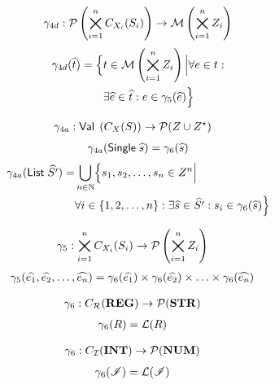 \begin{align}
    \gamma_{4d} : \mathcal{P}\left(\bigtimes_{i = 1}^{n}C_{X_i}(S_i)\right) \rightarrow \mathcal{M}\left(\bigtimes_{i = 1}^n Z_i\right)
\end{align}
\begin{align}
    \begin{split}
        \gamma_{4d}(\widehat{t}) = \Bigl\{ &t \in \mathcal{M}\left(\bigtimes_{i = 1}^n Z_i\right) \Big|\forall e \in t : \\
        &\exists \widehat{e} \in \widehat{t} :e \in \gamma_5(\widehat{e}) \Bigr\}
    \end{split}
\end{align}

\begin{align}
    \gamma_{4a} &: \mathsf{Val} \; \left(C_{X}(S)\right) \rightarrow \mathcal{P}(Z \cup Z^\star)
\end{align}
\begin{align}
    \gamma_{4a}(\mathsf{Single} \; \widehat{s}) = \gamma_6(\widehat{s})
\end{align}
\begin{align}
    \begin{split}
        \gamma_{4a}(\mathsf{List} \; \widehat{S'}) = &\bigcup_{n \in \mathbb{N}}\Bigl\{s_1, s_2, \dots, s_n \in Z^n \Big| \\
        &\forall i \in \{1, 2, \dots, n\} : \exists \widehat{s} \in \widehat{S'} : s_i \in \gamma_6(\widehat{s}) \Bigr\}
    \end{split}
\end{align}

\begin{align}
    \gamma_5 &: \bigtimes_{i = 1}^{n}C_{X_i}(S_i) \rightarrow \mathcal{P}\left(\bigtimes_{i = 1}^n Z_i \right)
\end{align}
\begin{align}
    \gamma_5(\widehat{e_1}, \widehat{e_2}, \dots, \widehat{e_n}) &= \gamma_6(\widehat{e_1}) \times \gamma_6(\widehat{e_2}) \times \dots \times \gamma_6(\widehat{e_n})
\end{align}

\begin{align}
    \gamma_6 &: C_{\mathcal{R}}(\mathbf{REG}) \rightarrow \mathcal{P}(\mathbf{STR})
\end{align}
\begin{align}
    \gamma_6(R) &= \mathcal{L}(R)
\end{align}

\begin{align}
    \gamma_6 &: C_{\mathcal{\mathcal{I}}}(\mathbf{INT}) \rightarrow \mathcal{P}(\mathbf{NUM})
\end{align}
\begin{align}
    \gamma_6(\mathscr{I}) &= \mathcal{L}(\mathscr{I})
\end{align}
